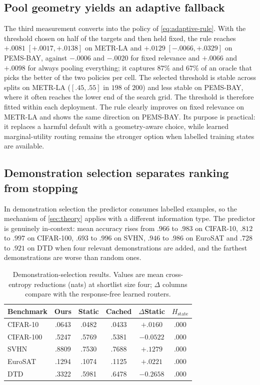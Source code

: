 \subsection{Pool geometry yields an adaptive fallback}

The third measurement converts into the policy of \cref{eq:adaptive-rule}. With
the threshold chosen on half of the targets and then held fixed, the rule
reaches $+.0081\;[+.0017,+.0138]$ on METR-LA and $+.0129\;[-.0066,+.0329]$ on
PEMS-BAY, against $-.0006$ and $-.0020$ for fixed relevance and $+.0066$ and
$+.0098$ for always pooling everything; it captures $87\%$ and $67\%$ of an
oracle that picks the better of the two policies per cell. The selected threshold is stable across splits on METR-LA ($[.45,.55]$ in
$198$ of $200$) and less stable on PEMS-BAY, where it often reaches the lower
end of the search grid. The threshold is therefore fitted within each
deployment. The rule clearly improves on fixed relevance on METR-LA and shows
the same direction on PEMS-BAY. Its purpose is practical: it replaces a harmful
default with a geometry-aware choice, while learned marginal-utility routing
remains the stronger option when labelled training states are available.

\subsection{Demonstration selection separates ranking from stopping}

In demonstration selection the predictor consumes labelled examples, so the
mechanism of \cref{sec:theory} applies with a different information type. The
predictor is genuinely in-context: mean accuracy rises from $.966$ to $.983$ on
CIFAR-10, $.812$ to $.997$ on CIFAR-100, $.693$ to $.996$ on SVHN, $.946$ to
$.986$ on EuroSAT and $.728$ to $.921$ on DTD when four relevant demonstrations
are added, and the farthest demonstrations are worse than random ones.

\begin{table}[t]
 \centering
 \small
 \caption{Demonstration-selection results. Values are mean cross-entropy
 reductions (nats) at shortlist size four; $\Delta$ columns compare with the
 response-free learned routers.}
 \label{tab:second-family}
 \begin{tabular}{lccccc}
  \toprule
  Benchmark & Ours & Static & Cached & $\Delta$Static & $H_{\mathrm{state}}$\\
  \midrule
  CIFAR-10 & .0643 & .0482 & .0433 & $+.0160$ & .000\\
  CIFAR-100 & .5247 & .5769 & .5381 & $-0.0522$ & .000\\
  SVHN & .8809 & .7530 & .7688 & $+.1279$ & .000\\
  EuroSAT & .1294 & .1074 & .1125 & $+.0221$ & .000\\
  DTD & .3322 & .5981 & .6478 & $-0.2658$ & .000\\
  \bottomrule \end{tabular}
\end{table}

